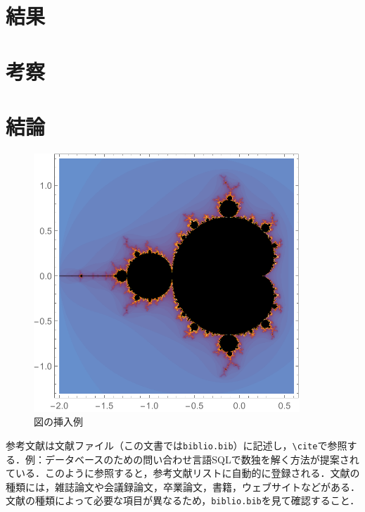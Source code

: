\chapter{結果}

\chapter{考察}

\chapter{結論}

\begin{figure}[htb]
\centering
\includegraphics[width=10cm]{figure.pdf}
\caption{図の挿入例}\label{サンプル図}
\end{figure}

参考文献は文献ファイル（この文書では\verb|biblio.bib|）に記述し，\verb|\cite|で参照する．例：データベースのための問い合わせ言語SQLで数独を解く方法が提案されている\cite{yabuki2011}．このように参照すると，参考文献リストに自動的に登録される．文献の種類には，雑誌論文\cite{yabuki2011}や会議録論文\cite{yabuki2013}，卒業論文\cite{kubo2014}，書籍\cite{okumura2013}，ウェブサイト\cite{self}などがある．文献の種類によって必要な項目が異なるため，\verb|biblio.bib|を見て確認すること．



